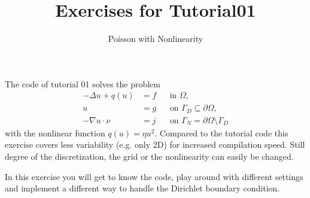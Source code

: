 \documentclass[12pt,a4paper]{article}
\title{\textbf{Exercises for Tutorial01}}
\subtitle{Poisson with Nonlinearity}
\begin{document}
\exerciseheader

The code of tutorial 01 solves the problem
\begin{align*}
  -\Delta u + q(u) &= f &&\text{in $\Omega$},\\
  u &= g &&\text{on $\Gamma_D\subseteq\partial\Omega$},\\
  -\nabla u\cdot \nu &= j &&\text{on $\Gamma_N=\partial\Omega\setminus\Gamma_D$}
\end{align*}
with the nonlinear function $q(u)=\eta u^2$.  Compared to the tutorial
code this exercise covers less variability (e.g. only 2D) for
increased compilation speed. Still degree of the discretization, the
grid or the nonlinearity can easily be changed.

In this exercise you will get to know the code, play around with
different settings and implement a different way to handle the
Dirichlet boundary condition.
\end{document}
